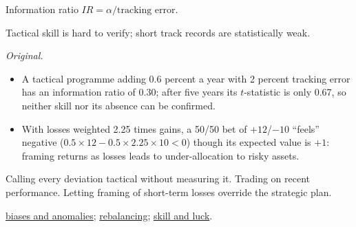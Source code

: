 \begin{qfmethod}
 Information ratio $IR=\alpha/\text{tracking error}$.

 Tactical skill is hard to verify; short track records are statistically weak.

 \emph{Original.}
\begin{itemize}
\item A tactical programme adding 0.6 percent a year with 2 percent tracking error has an information ratio of 0.30; after five years its $t$-statistic is only 0.67, so neither skill nor its absence can be confirmed.
\item With losses weighted 2.25 times gains, a 50/50 bet of $+12$/$-10$ ``feels'' negative ($0.5\times12-0.5\times2.25\times10<0$) though its expected value is $+1$: framing returns as losses leads to under-allocation to risky assets.
\end{itemize}

 Calling every deviation tactical without measuring it. Trading on recent performance. Letting framing of short-term losses override the strategic plan.

 \hyperref[mech:biases-market-anomalies]{biases and anomalies}; \hyperref[meth:allocation-implementation-rebalancing]{rebalancing}; \hyperref[meth:skill-luck-significance-tests]{skill and luck}.

\end{qfmethod}
